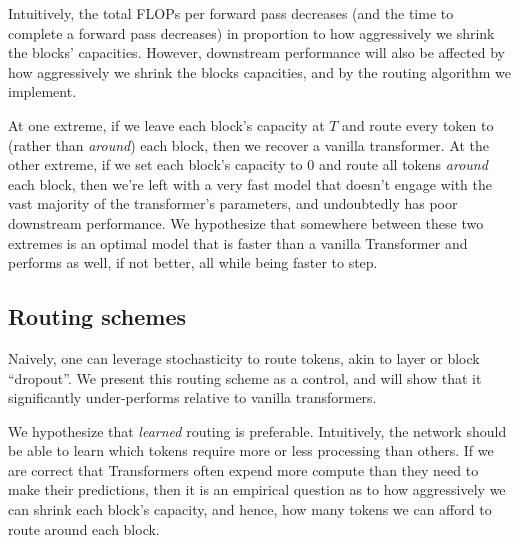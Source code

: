 \documentclass[11pt, a4paper, onecolumn, logo, copyright]{googledeepmind}
\begin{document}
Intuitively, the total FLOPs per forward pass decreases (and the time to complete a forward pass decreases) in proportion to how aggressively we shrink the blocks' capacities. However, downstream performance will also be affected by how aggressively we shrink the blocks capacities, and by the routing algorithm we implement. 

At one extreme, if we leave each block's capacity at $T$ and route every token to (rather than \emph{around}) each block, then we recover a vanilla transformer. At the other extreme, if we set each block's capacity to $0$ and route all tokens \emph{around} each block, then we're left with a very fast model that doesn't engage with the vast majority of the transformer's parameters, and undoubtedly has poor downstream performance. We hypothesize that somewhere between these two extremes is an optimal model that is faster than a vanilla Transformer and performs as well, if not better, all while being faster to step.

\subsection{Routing schemes}
\label{sec:routing-scheme}
Naively, one can leverage stochasticity to route tokens, akin to layer or block ``dropout''. We present this routing scheme as a control, and will show that it significantly under-performs relative to vanilla transformers.

We hypothesize that \emph{learned} routing is preferable. Intuitively, the network should be able to learn which tokens require more or less processing than others. If we are correct that Transformers often expend more compute than they need to make their predictions, then it is an empirical question as to how aggressively we can shrink each block's capacity, and hence, how many tokens we can afford to route around each block. 
\end{document}

